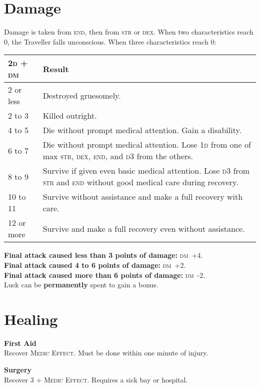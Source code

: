 \documentclass[10pt]{article}
\newcommand\dice[1]{\textsc{#1}}
\newcommand{\diemod}[1]{\textsc{dm}~#1}
\begin{document}
\begin{multicols}{2}
\section{Damage}

Damage is taken from \textsc{end}, then from \textsc{str} or
\textsc{dex}.  When two characteristics reach 0, the Traveller falls
unconscious.  When three characteristics reach 0:

\begin{tabularx}{\linewidth}{lX} \toprule
\dice{2d + dm} & Result \\ \midrule
2 or less & Destroyed gruesomely. \\
2 to 3 & Killed outright. \\
4 to 5 & Die without prompt medical attention.  Gain a disability. \\
6 to 7 & Die without prompt medical attention.  Lose \dice{1d} from one of max \textsc{str}, \textsc{dex}, \textsc{end}, and \dice{d3} from the others. \\
8 to 9 & Survive if given even basic medical attention.  Lose \dice{d3} from \textsc{str} and \textsc{end} without good medical care during recovery. \\
10 to 11 & Survive without assistance and make a full recovery with care. \\
12 or more & Survive and make a full recovery even without assistance. \\ \bottomrule
\end{tabularx}

\textbf{Final attack caused less than 3 points of damage:} \diemod{+4}.\\
\textbf{Final attack caused 4 to 6 points of damage:} \diemod{+2}.\\
\textbf{Final attack caused more than 6 points of damage:} \diemod{-2}.\\
Luck can be \textbf{permanently} spent to gain a bonus.

\vfill\columnbreak
\section{Healing}
\textbf{First Aid}\\
Recover \dice{Medic Effect}.  Must be done within one minute of
injury.

\textbf{Surgery}\\
Recover \dice{3 + Medic Effect}.  Requires a sick bay or hospital.


\end{multicols}
\end{document}
